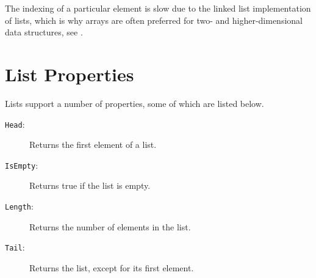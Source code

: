 \documentclass[fsharpNotes.tex]{subfiles}
\begin{document}
 The indexing of a particular element is slow due to the linked list implementation of lists, which is why arrays are often preferred for two- and higher-dimensional data structures, see .
 \clearpage
 
\section{List Properties}
Lists support a number of properties, some of which are listed below.
\begin{description}
\item[\texttt{Head}:] Returns the first element of a list.
  ~\\
\item[\texttt{IsEmpty}:] Returns true if the list is empty.
  ~\\
\item[\texttt{Length}:] Returns the number of elements in the list.
  ~\\
\item[\texttt{Tail}:] Returns the list, except for its first element.
  ~\\
\end{description}
\end{document}
